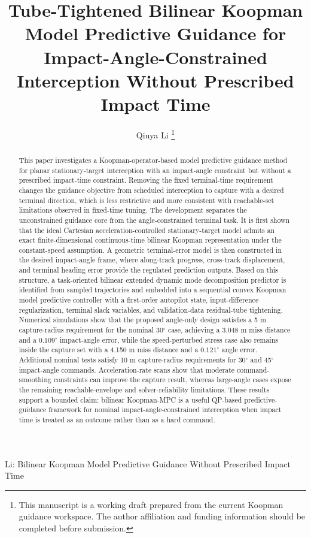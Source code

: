 \documentclass[letterpaper,journal]{IEEEtran}
\begin{document}
\title{Tube-Tightened Bilinear Koopman Model Predictive Guidance for Impact-Angle-Constrained Interception Without Prescribed Impact Time}

\author{Qiuya Li
\thanks{This manuscript is a working draft prepared from the current Koopman guidance workspace. The author affiliation and funding information should be completed before submission.}}

%
{Li: Bilinear Koopman Model Predictive Guidance Without Prescribed Impact Time}

\maketitle

\begin{abstract}
This paper investigates a Koopman-operator-based model predictive guidance method for planar stationary-target interception with an impact-angle constraint but without a prescribed impact-time constraint. Removing the fixed terminal-time requirement changes the guidance objective from scheduled interception to capture with a desired terminal direction, which is less restrictive and more consistent with reachable-set limitations observed in fixed-time tuning. The development separates the unconstrained guidance core from the angle-constrained terminal task. It is first shown that the ideal Cartesian acceleration-controlled stationary-target model admits an exact finite-dimensional continuous-time bilinear Koopman representation under the constant-speed assumption. A geometric terminal-error model is then constructed in the desired impact-angle frame, where along-track progress, cross-track displacement, and terminal heading error provide the regulated prediction outputs. Based on this structure, a task-oriented bilinear extended dynamic mode decomposition predictor is identified from sampled trajectories and embedded into a sequential convex Koopman model predictive controller with a first-order autopilot state, input-difference regularization, terminal slack variables, and validation-data residual-tube tightening. Numerical simulations show that the proposed angle-only design satisfies a 5 m capture-radius requirement for the nominal 30$^\circ$ case, achieving a 3.048 m miss distance and a $0.109^\circ$ impact-angle error, while the speed-perturbed stress case also remains inside the capture set with a 4.150 m miss distance and a $0.121^\circ$ angle error. Additional nominal tests satisfy 10 m capture-radius requirements for 30$^\circ$ and 45$^\circ$ impact-angle commands. Acceleration-rate scans show that moderate command-smoothing constraints can improve the capture result, whereas large-angle cases expose the remaining reachable-envelope and solver-reliability limitations. These results support a bounded claim: bilinear Koopman-MPC is a useful QP-based predictive-guidance framework for nominal impact-angle-constrained interception when impact time is treated as an outcome rather than as a hard command.
\end{abstract}
\end{document}
